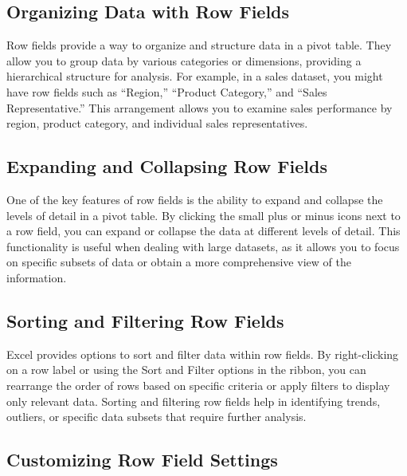 \documentclass[
]{book}
\begin{document}
\hypertarget{organizing-data-with-row-fields}{%
\subsection{Organizing Data with Row Fields}\label{organizing-data-with-row-fields}}

Row fields provide a way to organize and structure data in a pivot table. They allow you to group data by various categories or dimensions, providing a hierarchical structure for analysis. For example, in a sales dataset, you might have row fields such as ``Region,'' ``Product Category,'' and ``Sales Representative.'' This arrangement allows you to examine sales performance by region, product category, and individual sales representatives.

\hypertarget{expanding-and-collapsing-row-fields}{%
\subsection{Expanding and Collapsing Row Fields}\label{expanding-and-collapsing-row-fields}}

One of the key features of row fields is the ability to expand and collapse the levels of detail in a pivot table. By clicking the small plus or minus icons next to a row field, you can expand or collapse the data at different levels of detail. This functionality is useful when dealing with large datasets, as it allows you to focus on specific subsets of data or obtain a more comprehensive view of the information.

\hypertarget{sorting-and-filtering-row-fields}{%
\subsection{Sorting and Filtering Row Fields}\label{sorting-and-filtering-row-fields}}

Excel provides options to sort and filter data within row fields. By right-clicking on a row label or using the Sort and Filter options in the ribbon, you can rearrange the order of rows based on specific criteria or apply filters to display only relevant data. Sorting and filtering row fields help in identifying trends, outliers, or specific data subsets that require further analysis.

\hypertarget{customizing-row-field-settings}{%
\subsection{Customizing Row Field Settings}\label{customizing-row-field-settings}}
\end{document}
